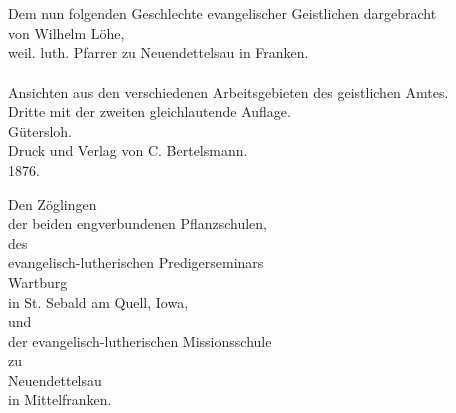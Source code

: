 \begin{titelseite}
\\[1.5em]
\end{titelseite}


\begin{titelseite}
\\[1.5em]
Dem nun folgenden Geschlechte evangelischer Geistlichen dargebracht\\[1.5em]
von Wilhelm Löhe,\\
weil. luth. Pfarrer zu Neuendettelsau in Franken.\\[1.5em]
\\[1em]
Ansichten aus den verschiedenen Arbeitsgebieten des geistlichen Amtes.\\[1.5em]
Dritte mit der zweiten gleichlautende Auflage.\\[1.5em]
Gütersloh.\\
Druck und Verlag von C. Bertelsmann.\\
1876.
\end{titelseite}


\begin{titelseite}
Den Zöglingen\\
der beiden engverbundenen Pflanzschulen,\\
des\\
evangelisch-lutherischen Predigerseminars\\
Wartburg\\
in St. Sebald am Quell, Iowa,\\
und\\
der evangelisch-lutherischen Missionsschule\\
zu\\
Neuendettelsau\\
in Mittelfranken.
\end{titelseite}



